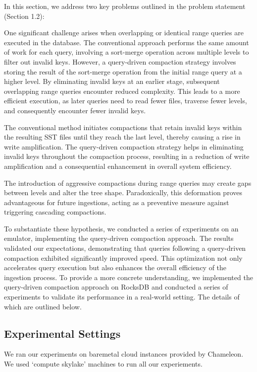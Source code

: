 In this section, we address two key problems outlined in the problem statement (Section 1.2):

 One significant challenge arises when overlapping or identical range queries are executed in 
the database. The conventional approach performs the same amount of work for each query, involving a sort-merge 
operation across multiple levels to filter out invalid keys. However, a query-driven compaction strategy involves 
storing the result of the sort-merge operation from the initial range query at a higher level. By eliminating invalid 
keys at an earlier stage, subsequent overlapping range queries encounter reduced complexity. This leads to a more 
efficient execution, as later queries need to read fewer files, traverse fewer levels, and consequently encounter fewer 
invalid keys.

 The conventional method initiates compactions that retain invalid keys within 
the resulting SST files until they reach the last level, thereby causing a rise in write amplification. The query-driven
compaction strategy helps in eliminating invalid keys throughout the compaction process, resulting in a reduction of 
write amplification and a consequential enhancement in overall system efficiency.

The introduction of aggressive compactions during range queries may create gaps between levels and alter the tree shape. 
Paradoxically, this deformation proves advantageous for future ingestions, acting as a preventive measure against 
triggering cascading compactions. 

To substantiate these hypothesis, we conducted a series of experiments on an emulator, 
implementing the query-driven compaction approach. The results validated our expectations, demonstrating that queries 
following a query-driven compaction exhibited significantly improved speed. This optimization not only accelerates query 
execution but also enhances the overall efficiency of the ingestion process. To provide a more concrete understanding, 
we implemented the query-driven compaction approach on RocksDB and conducted a series of experiments to validate its 
performance in a real-world setting. The details of which are outlined below.

\subsection{Experimental Settings}
We ran our experiments on baremetal cloud instances provided by Chameleon. We used `compute skylake' machines to run all 
our experiements.

